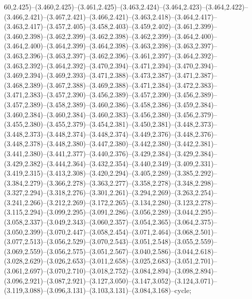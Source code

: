 60,2.425)--(3.460,2.425)--(3.461,2.425)--(3.463,2.424)--(3.464,2.423)--(3.464,2.422)--(3.466,2.421)--(3.467,2.421)--(3.466,2.421)--(3.463,2.418)--(3.464,2.417)--(3.463,2.417)--(3.457,2.405)--(3.458,2.403)--(3.459,2.402)--(3.461,2.399)--(3.460,2.398)--(3.462,2.399)--(3.462,2.398)--(3.462,2.399)--(3.464,2.400)--(3.464,2.400)--(3.464,2.399)--(3.464,2.398)--(3.463,2.398)--(3.463,2.397)--(3.463,2.396)--(3.463,2.397)--(3.462,2.396)--(3.461,2.397)--(3.464,2.392)--(3.463,2.392)--(3.464,2.392)--(3.470,2.394)--(3.471,2.394)--(3.470,2.394)--(3.469,2.394)--(3.469,2.393)--(3.471,2.388)--(3.473,2.387)--(3.471,2.387)--(3.468,2.389)--(3.467,2.388)--(3.469,2.388)--(3.471,2.384)--(3.472,2.383)--(3.471,2.383)--(3.457,2.390)--(3.456,2.389)--(3.457,2.390)--(3.456,2.389)--(3.457,2.389)--(3.458,2.389)--(3.460,2.386)--(3.458,2.386)--(3.459,2.384)--(3.460,2.384)--(3.460,2.384)--(3.460,2.383)--(3.456,2.380)--(3.456,2.379)--(3.455,2.380)--(3.455,2.379)--(3.454,2.381)--(3.450,2.381)--(3.448,2.373)--(3.448,2.373)--(3.448,2.374)--(3.448,2.374)--(3.449,2.376)--(3.448,2.376)--(3.448,2.378)--(3.448,2.380)--(3.447,2.380)--(3.442,2.380)--(3.442,2.381)--(3.441,2.380)--(3.441,2.377)--(3.440,2.376)--(3.429,2.384)--(3.429,2.384)--(3.429,2.382)--(3.444,2.364)--(3.432,2.354)--(3.440,2.349)--(3.409,2.331)--(3.419,2.315)--(3.413,2.308)--(3.420,2.294)--(3.405,2.289)--(3.385,2.292)--(3.384,2.279)--(3.366,2.278)--(3.363,2.277)--(3.358,2.278)--(3.348,2.298)--(3.327,2.294)--(3.318,2.276)--(3.301,2.261)--(3.294,2.269)--(3.263,2.254)--(3.241,2.266)--(3.212,2.269)--(3.172,2.265)--(3.134,2.280)--(3.123,2.278)--(3.115,2.294)--(3.099,2.295)--(3.091,2.286)--(3.056,2.289)--(3.044,2.295)--(3.058,2.337)--(3.049,2.343)--(3.060,2.357)--(3.054,2.365)--(3.064,2.375)--(3.050,2.399)--(3.070,2.447)--(3.058,2.454)--(3.071,2.464)--(3.068,2.501)--(3.077,2.513)--(3.056,2.529)--(3.070,2.543)--(3.051,2.548)--(3.055,2.559)--(3.069,2.559)--(3.056,2.575)--(3.051,2.567)--(3.040,2.586)--(3.044,2.618)--(3.028,2.629)--(3.026,2.653)--(3.011,2.658)--(3.025,2.683)--(3.051,2.701)--(3.061,2.697)--(3.070,2.710)--(3.018,2.752)--(3.084,2.894)--(3.098,2.894)--(3.096,2.921)--(3.087,2.921)--(3.127,3.050)--(3.147,3.052)--(3.124,3.071)--(3.119,3.088)--(3.096,3.131)--(3.103,3.131)--(3.084,3.168)--cycle;
